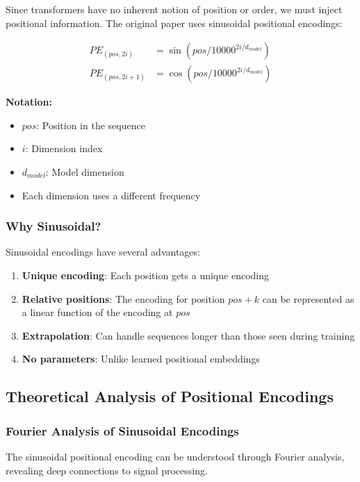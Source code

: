 Since transformers have no inherent notion of position or order, we must inject positional information. The original paper uses sinusoidal positional encodings:

\begin{align}
PE_{(pos,2i)} &= \sin(pos/10000^{2i/d_{model}}) \\
PE_{(pos,2i+1)} &= \cos(pos/10000^{2i/d_{model}})
\end{align}
\begin{notationbox}
\textbf{Notation:}
\begin{itemize}
    \item $pos$: Position in the sequence
    \item $i$: Dimension index
    \item $d_{model}$: Model dimension
    \item Each dimension uses a different frequency
\end{itemize}
\end{notationbox}

\subsubsection{Why Sinusoidal?}

Sinusoidal encodings have several advantages:
\begin{enumerate}
    \item \textbf{Unique encoding}: Each position gets a unique encoding
    \item \textbf{Relative positions}: The encoding for position $pos + k$ can be represented as a linear function of the encoding at $pos$
    \item \textbf{Extrapolation}: Can handle sequences longer than those seen during training
    \item \textbf{No parameters}: Unlike learned positional embeddings
\end{enumerate}

\subsection{Theoretical Analysis of Positional Encodings}

\subsubsection{Fourier Analysis of Sinusoidal Encodings}

The sinusoidal positional encoding can be understood through Fourier analysis, revealing deep connections to signal processing.

